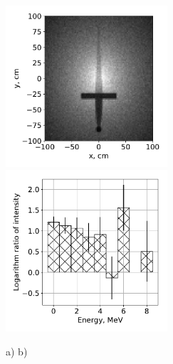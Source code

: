 \documentclass[a4paper]{panl}
\begin{document}
\begin{figure}[t]
    \begin{center}
        \includegraphics[width=60mm]{figures/Sword.pdf} 
        \includegraphics[width=60mm]{figures/Difference.pdf}  
        \vspace{-3mm}
        \caption{a) b)}
    \end{center}
    \vspace{-5mm}
\end{figure}
\end{document}
